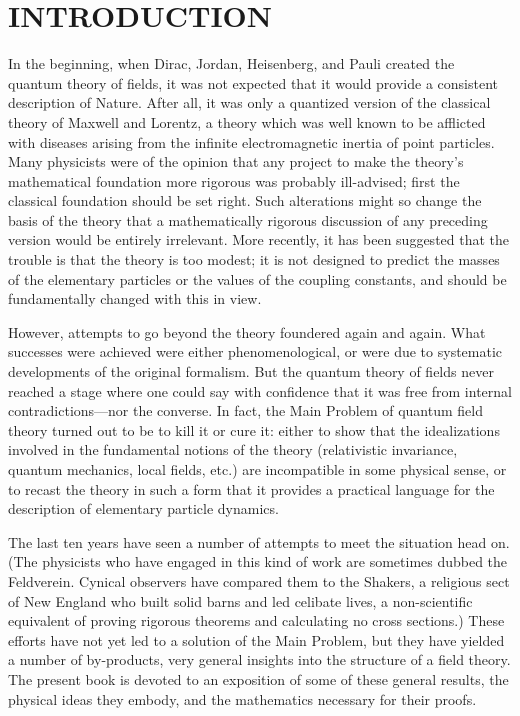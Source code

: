 \section*{INTRODUCTION}

In the beginning, when Dirac, Jordan, Heisenberg, and Pauli created the quantum theory of fields, it was not expected that it would provide a consistent description of Nature. After all, it was only a quantized version of the classical theory of Maxwell and Lorentz, a theory which was well known to be afflicted with diseases arising from the infinite electromagnetic inertia of point particles. Many physicists were of the opinion that any project to make the theory's mathematical foundation more rigorous was probably ill-advised; first the classical foundation should be set right. Such alterations might so change the basis of the theory that a mathematically rigorous discussion of any preceding version would be entirely irrelevant. More recently, it has been suggested that the trouble is that the theory is too modest; it is not designed to predict the masses of the elementary particles or the values of the coupling constants, and should be fundamentally changed with this in view.

However, attempts to go beyond the theory foundered again and again. What successes were achieved were either phenomenological, or were due to systematic developments of the original formalism. But the quantum theory of fields never reached a stage where one could say with confidence that it was free from internal contradictions---nor the converse. In fact, the Main Problem of quantum field theory turned out to be to kill it or cure it: either to show that the idealizations involved in the fundamental notions of the theory (relativistic invariance, quantum mechanics, local fields, etc.) are incompatible in some physical sense, or to recast the theory in such a form that it provides a practical language for the description of elementary particle dynamics.

The last ten years have seen a number of attempts to meet the situation head on. (The physicists who have engaged in this kind of work are sometimes dubbed the Feldverein. Cynical observers have compared them to the Shakers, a religious sect of New England who built solid barns and led celibate lives, a non-scientific equivalent of proving rigorous theorems and calculating no cross sections.) These efforts have not yet led to a solution of the Main Problem, but they have yielded a number of by-products, very general insights into the structure of a field theory. The present book is devoted to an exposition of some of these general results, the physical ideas they embody, and the mathematics necessary for their proofs.

